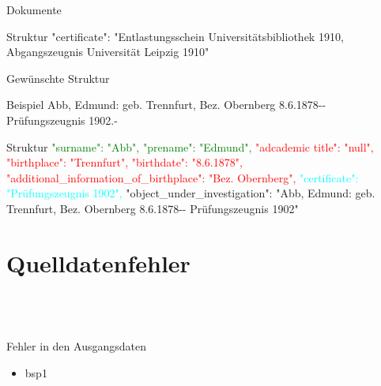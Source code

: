 \documentclass[12pt]{beamer}
\begin{document}
\begin{large}
\begin{frame}{Dokumente}
 \begin{block}{Struktur}
  \normalsize
  \hspace*{0.5cm} 
  "{}certificate"{}: "{}Entlastungsschein Universitätsbibliothek 1910, Abgangszeugnis Universität Leipzig 1910"{}
 \end{block}
 
\end{frame}

\begin{frame}{Gewünschte Struktur}
 \begin{block}{Beispiel}
  \small
  Abb, Edmund: geb. Trennfurt, Bez. Obernberg 8.6.1878-{}- Prüfungszeugnis 1902.-
 \end{block}

 \begin{block}{Struktur}
  \small
  \textcolor{green}{"{}surname"{}: "{}Abb"{},}
  \newline
  \textcolor{green}{"{}prename"{}: "{}Edmund"{},}
  \newline 
  \textcolor{red}{"{}adcademic title"{}: "{}null"{},}
  \newline 
  \textcolor{red}{"{}birthplace"{}: "{}Trennfurt"{},}
  \newline
  \textcolor{red}{"{}birthdate"{}: "{}8.6.1878"{},}
  \newline
  \textcolor{red}{"{}additional\_information\_of\_birthplace"{}: "{}Bez. Obernberg"{},}
  \newline
  \textcolor{cyan}{"{}certificate"{}: "{}Prüfungszeugnis 1902"{},}
  \newline
  "{}object\_under\_investigation"{}: "{}Abb, Edmund: geb. Trennfurt, Bez. Obernberg 8.6.1878-{}- Prüfungszeugnis 1902"{}
 \end{block} 
\end{frame}




\section{Quelldatenfehler}
 \subsection*{~}
\begin{frame}{Fehler in den Ausgangsdaten}
 \begin{itemize}
  \item bsp1
  
 \end{itemize}
\end{frame}


\end{large}
\end{document}
